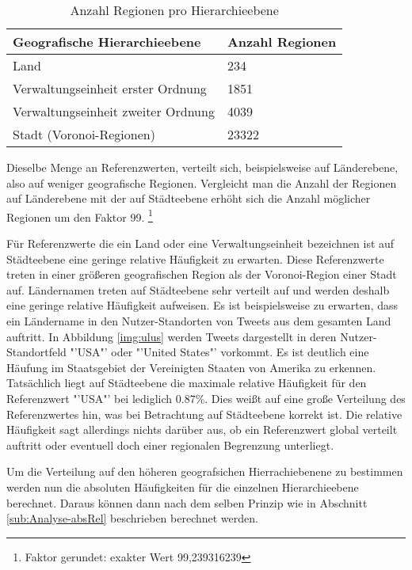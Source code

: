 			\begin{table}[h]
			\centering
			\begin{tabular}{|l|l|}
			\hline
			\textbf{Geografische Hierarchieebene} & \textbf{Anzahl Regionen} \\ \hline
			Land                                  & 234                      \\ \hline
			Verwaltungseinheit erster Ordnung     & 1851                     \\ \hline
			Verwaltungseinheit zweiter Ordnung    & 4039                     \\ \hline
			Stadt (Voronoi-Regionen)              & 23322                    \\ \hline
			\end{tabular}
			\caption{Anzahl Regionen pro Hierarchieebene}
			\label{tab:AnzahlRegionen}
			\end{table}

			Dieselbe Menge an Referenzwerten, verteilt sich, beispielsweise auf Länderebene, also auf weniger geografische Regionen. 
			Vergleicht man die Anzahl der Regionen auf Länderebene mit der auf Städteebene erhöht sich die Anzahl möglicher Regionen um den Faktor 99. \footnote{Faktor gerundet: exakter Wert 99,239316239}

			Für Referenzwerte die ein Land oder eine Verwaltungseinheit bezeichnen ist auf Städteebene eine geringe relative Häufigkeit zu erwarten.
			Diese Referenzwerte treten in einer größeren geografischen Region als der Voronoi-Region einer Stadt auf.
			Ländernamen treten auf Städteebene sehr verteilt auf und werden deshalb eine geringe relative Häufigkeit aufweisen.
			Es ist beispielsweise zu erwarten, dass ein Ländername in den Nutzer-Standorten von Tweets aus dem gesamten Land auftritt.
			In Abbildung \ref{img:ulus} werden Tweets dargestellt in deren Nutzer-Standortfeld "'USA"' oder "'United States"' vorkommt.
			Es ist deutlich eine Häufung im Staatsgebiet der Vereinigten Staaten von Amerika zu erkennen.
			Tatsächlich liegt auf Städteebene die maximale relative Häufigkeit für den Referenzwert "'USA"' bei lediglich 0.87\%.   
			Dies weißt auf eine große Verteilung des Referenzwertes hin, was bei Betrachtung auf Städteebene korrekt ist.
			Die relative Häufigkeit sagt allerdings nichts darüber aus, ob ein Referenzwert global verteilt auftritt oder eventuell doch einer regionalen Begrenzung unterliegt. 

			Um die Verteilung auf den höheren geografsichen Hierrachiebenene zu bestimmen werden nun die absoluten Häufigkeiten für die einzelnen Hierarchieebene berechnet.
			Daraus können dann nach dem selben Prinzip wie in Abschnitt \ref{sub:Analyse-absRel} beschrieben berechnet werden.
			
